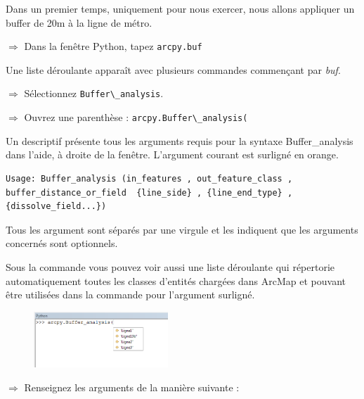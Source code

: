 \documentclass[11pt]{article}
\newcommand{\action}{$\Rightarrow$ }
\newcommand{\code}[1]{\lstinline{#1}}
\begin{document}
Dans un premier temps, uniquement pour nous exercer, nous allons appliquer un buffer de 20m à la ligne de métro.

\action Dans la fenêtre Python, tapez \code{arcpy.buf}

Une liste déroulante apparaît avec plusieurs commandes commençant par \textit{buf}.

\action Sélectionnez \code{Buffer\_analysis}.

\action Ouvrez une parenthèse : \code{arcpy.Buffer\_analysis(}

Un descriptif présente tous les arguments requis pour la syntaxe Buffer\_analysis dans l’aide, à droite de la fenêtre. L'argument courant est surligné en orange.
\begin{lstlisting}
Usage: Buffer_analysis (in_features , out_feature_class , buffer_distance_or_field  {line_side} , {line_end_type} , {dissolve_field...})
\end{lstlisting}

Tous les argument sont séparés par une virgule et les {} indiquent que les arguments concernés sont optionnels.

Sous la commande vous pouvez voir aussi une liste déroulante qui répertorie automatiquement toutes les classes d'entités chargées dans ArcMap et pouvant être utilisées dans la commande pour l'argument surligné.
\begin{figure}[H]
	\center \includegraphics[width=0.45\textwidth]{img/td3/python_console_aide.png}\\
\end{figure}

\action Renseignez les arguments de la manière suivante :
\end{document}
